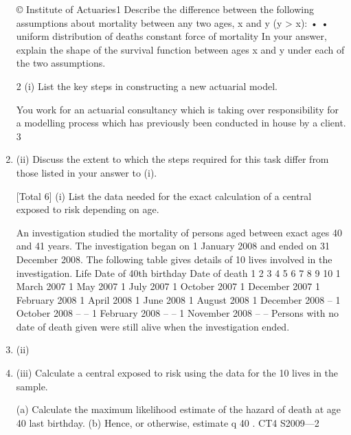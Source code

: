 \documentclass[a4paper,12pt]{article}
\begin{document}
\begin{enumerate}
© Institute of Actuaries1
Describe the difference between the following assumptions about mortality between
any two ages, x and y (y > x):
•
•
uniform distribution of deaths
constant force of mortality
In your answer, explain the shape of the survival function between ages x and y under
each of the two assumptions.

2
(i)
List the key steps in constructing a new actuarial model.

You work for an actuarial consultancy which is taking over responsibility for a
modelling process which has previously been conducted in house by a client.
3
\item (ii) Discuss the extent to which the steps required for this task differ from those
listed in your answer to (i).

[Total 6]
(i) List the data needed for the exact calculation of a central exposed to risk
depending on age.

An investigation studied the mortality of persons aged between exact ages 40 and 41
years. The investigation began on 1 January 2008 and ended on 31 December 2008.
The following table gives details of 10 lives involved in the investigation.
Life Date of 40th birthday Date of death
1
2
3
4
5
6
7
8
9
10 1 March 2007
1 May 2007
1 July 2007
1 October 2007
1 December 2007
1 February 2008
1 April 2008
1 June 2008
1 August 2008
1 December 2008 –
1 October 2008
–
–
1 February 2008
–
–
1 November 2008
–
–
Persons with no date of death given were still alive when the investigation ended.
\item (ii)
\item (iii)
Calculate a central exposed to risk using the data for the 10 lives in the
sample.

(a) Calculate the maximum likelihood estimate of the hazard of death at
age 40 last birthday.
(b) Hence, or otherwise, estimate q 40 .
CT4 S2009—2



\end{enumerate}
\end{document}
